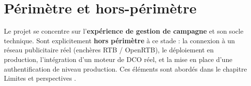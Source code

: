 \section{Périmètre et hors-périmètre}

Le projet se concentre sur l'\textbf{expérience de gestion de campagne} et son
socle technique. Sont explicitement \textbf{hors périmètre} à ce stade : la
connexion à un réseau publicitaire réel (enchères RTB / OpenRTB), le
déploiement en production, l'intégration d'un moteur de DCO réel, et la mise en
place d'une authentification de niveau production. Ces éléments sont abordés
dans le chapitre \og Limites et perspectives \fg{}.
